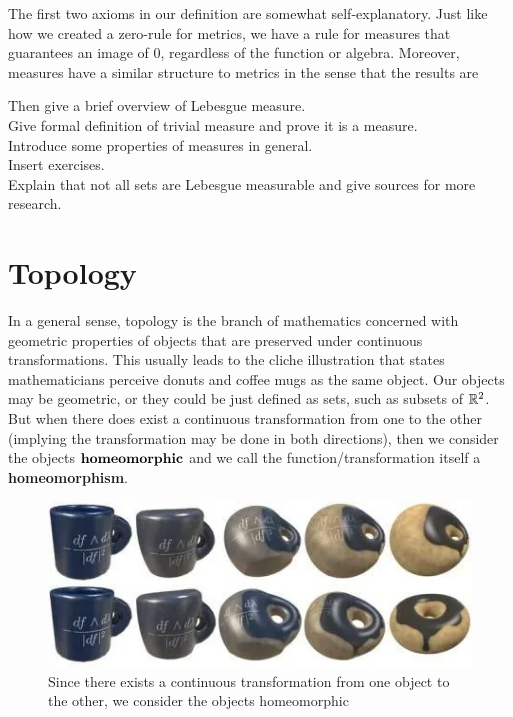 The first two axioms in our definition are somewhat self-explanatory. Just like how we created a zero-rule for metrics, we have a rule for measures that guarantees an image of $0$, regardless of the function or algebra. Moreover, measures have a similar structure to metrics in the sense that the results are 

Then give a brief overview of Lebesgue measure.\\

Give formal definition of trivial measure and prove it is a measure.\\

Introduce some properties of measures in general.\\

Insert exercises.\\

Explain that not all sets are Lebesgue measurable and give sources for more research.\\

\section{Topology}

In a general sense, topology is the branch of mathematics concerned with geometric properties of objects that are preserved under continuous transformations. This usually leads to the cliche illustration that states mathematicians perceive donuts and coffee mugs as the same object. Our objects may be geometric, or they could be just defined as sets, such as subsets of $\mathbb{R}^2$. But when there does exist a continuous transformation from one to the other (implying the transformation may be done in both directions), then we consider the objects $\textbf{homeomorphic}\index{Homeomorphic}$ and we call the function/transformation itself a \textbf{homeomorphism}.\\

\begin{figure}
    \centering
    \includegraphics[width=0.5\linewidth]{Images/Chap0/0.4.1.png}
    \caption{Since there exists a continuous transformation from one object to the other, we consider the objects homeomorphic}
    \label{fig:donut-coffee}
\end{figure}

